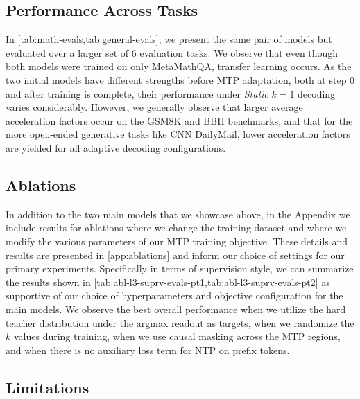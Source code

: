 \documentclass{article}
\theoremstyle{plain}
\theoremstyle{definition}
\theoremstyle{remark}
\begin{document}
\subsection{Performance Across Tasks}\label{sec:exps-perf-tasks} 

In \cref{tab:math-evals,tab:general-evals}, we present the same pair of models but evaluated over a larger set of 6 evaluation tasks. 
We observe that even though both models were trained on only MetaMathQA, transfer learning occurs.
As the two initial models have different strengths before MTP adaptation, both at step 0 and after training is complete, their performance under \textit{Static} $k=1$ decoding varies considerably. However, we generally observe that larger average acceleration factors occur on the GSM8K and BBH benchmarks, and that for the more open-ended generative tasks like CNN DailyMail, lower acceleration factors are yielded for all adaptive decoding configurations.


\subsection{Ablations}\label{sec:exps-abls}

In addition to the two main models that we showcase above, in the Appendix we include results for ablations where we change the training dataset and where we modify the various parameters of our MTP training objective. These details and results are presented in \cref{app:ablations} and inform our choice of settings for our primary experiments. Specifically in terms of supervision style, we can summarize the results shown in \cref{tab:abl-l3-suprv-evals-pt1,tab:abl-l3-suprv-evals-pt2} as supportive of our choice of hyperparameters and objective configuration for the main models. We observe the best overall performance when we utilize the hard teacher distribution under the argmax readout as targets, when we randomize the $k$ values during training, when we use causal masking across the MTP regions, and when there is no auxiliary loss term for NTP on prefix tokens.

\subsection{Limitations}\label{sec:limitations}
\end{document}
